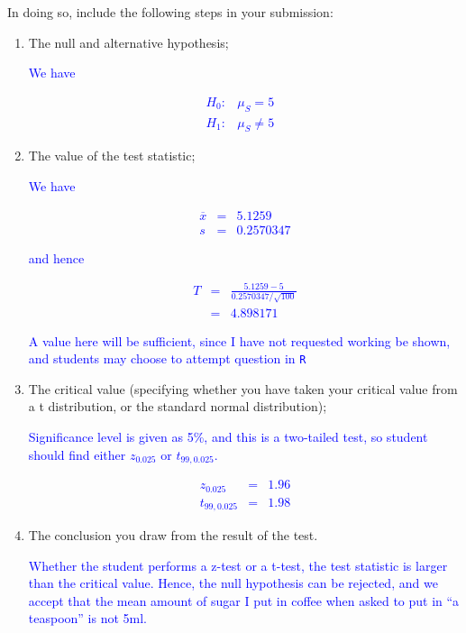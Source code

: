 \documentclass[11pt,a4paper]{article}
\begin{document}
\begin{enumerate}
In doing so, include the following steps in your submission:
\begin{enumerate}
\item The null and alternative hypothesis;

\textcolor{blue}{We have}

\textcolor{blue}{
\begin{eqnarray*}
H_0:&\mu_S=5&\\
H_1:&\mu_S\neq 5&
\end{eqnarray*}
}

 
\item The value of the test statistic;

\textcolor{blue}{We have}

\textcolor{blue}{
\begin{eqnarray*}
\overline{x}&=&5.1259\\
s&=&0.2570347
\end{eqnarray*}
}

\textcolor{blue}{and hence}

\textcolor{blue}{
\begin{eqnarray*}
T&=&\frac{5.1259-5}{0.2570347/\sqrt{100}}\\
&=&4.898171
\end{eqnarray*}
}

\textcolor{blue}{A value here will be sufficient, since I have not requested working be shown, and students may choose to attempt question in \texttt{R}}
 

\item The critical value (specifying whether you have taken your critical value from a t distribution, or the standard normal distribution);

\textcolor{blue}{Significance level is given as 5\%, and this is a two-tailed test, so student should find either $z_{0.025}$ or $t_{99,0.025}$.}

\textcolor{blue}{
\begin{eqnarray*}
z_{0.025}&=&1.96\\
t_{99,0.025}&=&1.98
\end{eqnarray*}
}
 

\item The conclusion you draw from the result of the test.


\textcolor{blue}{Whether the student performs a z-test or a t-test, the test statistic is larger than the critical value. Hence, the null hypothesis can be rejected, and we accept that the mean amount of sugar I put in coffee when asked to put in ``a teaspoon'' is not 5ml.}
 
\end{enumerate}


\end{enumerate}
\end{document}
